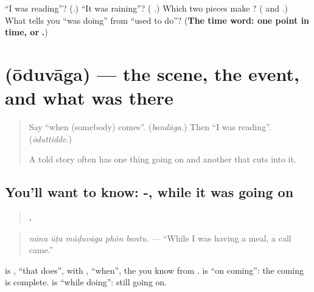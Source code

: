 \begin{tcolorbox}[breakable,colback=teal!4,colframe=teal!35!black,title={Before you move on}]
\textquotedblleft{}I was reading\textquotedblright{}? (\textbf{}.) \textquotedblleft{}It was raining\textquotedblright{}? (\textbf{ }.) Which two pieces make \textbf{}? (\textbf{} and \textbf{}.) What tells you \textquotedblleft{}was doing\textquotedblright{} from \textquotedblleft{}used to do\textquotedblright{}? (\textbf{The time word: one point in time, or }\textbf{.})
\end{tcolorbox}
\section[\texorpdfstring{\kn{ಓದುವಾಗ} (ōduvāga)}{ಓದುವಾಗ (ōduvāga)}]{ (ōduvāga) — the scene, the event, and what was there}

\label{lesson:KA-C309-oduvaga}



\begin{quote}
Say \textquotedblleft{}when (somebody) comes\textquotedblright{}. (\emph{bandāga}.) Then \textquotedblleft{}I was reading\textquotedblright{}. (\emph{ōduttidde}.)

A told story often has one thing going on and another that cuts into it.
\end{quote}

\subsection*{You'll want to know: -, while it was going on}
\begin{quote}
\textbf{    .}
\end{quote}

\begin{quote}
\emph{nānu ūṭa māḍuvāga phōn bantu.} — \textquotedblleft{}While I was having a meal, a call came.\textquotedblright{}
\end{quote}

\textbf{} is \textbf{}, \textquotedblleft{}that does\textquotedblright{}, with \textbf{}, \textquotedblleft{}when\textquotedblright{}, the \textbf{} you know from \textbf{}. \textbf{} is \textquotedblleft{}on coming\textquotedblright{}: the coming is complete. \textbf{} is \textquotedblleft{}while doing\textquotedblright{}: still going on.

